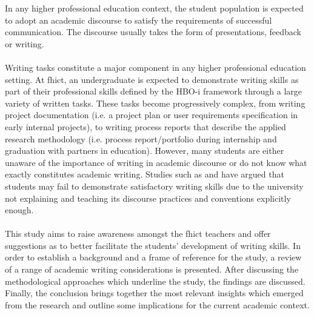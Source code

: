 In any higher professional education context, the student population is expected to adopt an academic discourse to satisfy the requirements of successful communication. 
The discourse usually takes the form of presentations, feedback or writing. 
\\\\
Writing tasks constitute a major component in any higher professional education setting.
At \acrshort{fhict}, an undergraduate is expected to demonstrate writing skills as part of their professional skills defined by the HBO-i framework through a large variety of written tasks.  
These tasks become progressively complex, from writing project documentation (i.e. a project plan or user requirements specification in early internal projects), to writing process reports that describe the applied research methodology (i.e. process report/portfolio during internship and graduation with partners in education).
However, many students are either unaware of the importance of writing in academic discourse or do not know what exactly constitutes academic writing.
Studies such as \citeauthor{Lillis2001} and \citeauthor{Elander2006} have argued that students may fail to demonstrate satisfactory writing skills due to the university not explaining and teaching its discourse practices and conventions explicitly enough.
\\\\
This study aims to raise awareness amongst the \acrshort{fhict} teachers and offer suggestions as to better facilitate the students’ development of writing skills.
In order to establish a background and a frame of reference for the study, a review of a range of academic writing considerations is presented. 
After discussing the methodological approaches which underline the study, the findings are discussed.
Finally, the conclusion brings together the most relevant insights which emerged from the research and outline some implications for the current academic context. 
